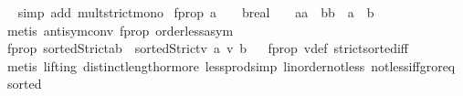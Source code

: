\begin{isabellebody}
\isadelimproof
\ %
\endisadelimproof
%
\isatagproof
{}\isamarkupfalse%
\ {\isacharparenleft}{\kern0pt}simp\ add{\isacharcolon}{\kern0pt}\ mult{\isacharunderscore}{\kern0pt}strict{\isacharunderscore}{\kern0pt}mono{\isacharparenright}{\kern0pt}%
\endisatagproof
{\isafoldproof}%
%
\isadelimproof
%
\endisadelimproof
\isanewline
{}\isamarkupfalse%
\ f{\isacharunderscore}{\kern0pt}prop{}{\isacharcolon}{\kern0pt}\ {\isachardoublequoteopen}{\isacharparenleft}{\kern0pt}{\isacharparenleft}{\kern0pt}a\ {\isachargreater}{\kern0pt}\ {}\ {\isasymand}\ {\isacharparenleft}{\kern0pt}b{\isacharcolon}{\kern0pt}{\isacharcolon}{\kern0pt}real{\isacharparenright}{\kern0pt}\ {\isachargreater}{\kern0pt}\ {}{\isacharparenright}{\kern0pt}\ {\isasymlongrightarrow}\ {\isacharparenleft}{\kern0pt}a{\isacharasterisk}{\kern0pt}a\ {\isacharless}{\kern0pt}\ b{\isacharasterisk}{\kern0pt}b{\isacharparenright}{\kern0pt}\ {\isasymlongrightarrow}\ {\isacharparenleft}{\kern0pt}a\ {\isacharless}{\kern0pt}\ b{\isacharparenright}{\kern0pt}{\isacharparenright}{\kern0pt}{\isachardoublequoteclose}%
\isadelimproof
\ %
\endisadelimproof
%
\isatagproof
{}\isamarkupfalse%
\ {\isacharparenleft}{\kern0pt}metis\ antisym{\isacharunderscore}{\kern0pt}conv{}\ f{\isacharunderscore}{\kern0pt}prop{}\ order{\isacharunderscore}{\kern0pt}less{\isacharunderscore}{\kern0pt}asym{\isacharprime}{\kern0pt}{\isacharparenright}{\kern0pt}%
\endisatagproof
{\isafoldproof}%
%
\isadelimproof
%
\endisadelimproof
\isanewline
{}\isamarkupfalse%
\ f{\isacharunderscore}{\kern0pt}prop{}{\isacharcolon}{\kern0pt}\ {\isachardoublequoteopen}sortedStrict{\isacharbrackleft}{\kern0pt}a{\isacharcomma}{\kern0pt}b{\isacharbrackright}{\kern0pt}\ {\isasymlongleftrightarrow}\ sortedStrict{\isacharbrackleft}{\kern0pt}v{}\ a{\isacharcomma}{\kern0pt}\ v{}\ b{\isacharbrackright}{\kern0pt}{\isachardoublequoteclose}%
\isadelimproof
\ %
\endisadelimproof
%
\isatagproof
{}\isamarkupfalse%
\ f{\isacharunderscore}{\kern0pt}prop{}\ v{}{\isacharunderscore}{\kern0pt}def\ strict{\isacharunderscore}{\kern0pt}sorted{\isacharunderscore}{\kern0pt}iff\isanewline
\ \ \isamarkupfalse%
\ {\isacharparenleft}{\kern0pt}metis\ {\isacharparenleft}{\kern0pt}lifting{\isacharparenright}{\kern0pt}\ distinct{\isacharunderscore}{\kern0pt}length{\isacharunderscore}{\kern0pt}{}{\isacharunderscore}{\kern0pt}or{\isacharunderscore}{\kern0pt}more\ less{\isacharunderscore}{\kern0pt}prod{\isacharunderscore}{\kern0pt}simp\ linorder{\isacharunderscore}{\kern0pt}not{\isacharunderscore}{\kern0pt}less\ not{\isacharunderscore}{\kern0pt}less{\isacharunderscore}{\kern0pt}iff{\isacharunderscore}{\kern0pt}gr{\isacharunderscore}{\kern0pt}or{\isacharunderscore}{\kern0pt}eq\ sorted{}\isanewline

\end{isabellebody}
